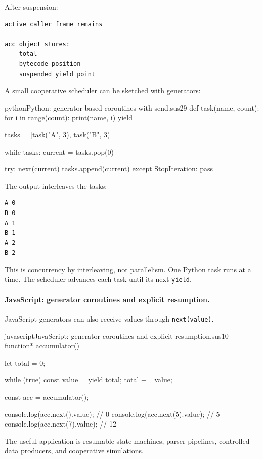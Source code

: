 After suspension:

\begin{verbatim}
active caller frame remains

acc object stores:
    total
    bytecode position
    suspended yield point
\end{verbatim}

A small cooperative scheduler can be sketched with generators:

\begin{codebox}[]{python}{Python: generator-based coroutines with send.}{sus29}
def task(name, count):
    for i in range(count):
        print(name, i)
        yield


tasks = [task("A", 3), task("B", 3)]

while tasks:
    current = tasks.pop(0)

    try:
        next(current)
        tasks.append(current)
    except StopIteration:
        pass
\end{codebox}


The output interleaves the tasks:

\begin{verbatim}
A 0
B 0
A 1
B 1
A 2
B 2
\end{verbatim}

This is concurrency by interleaving, not parallelism. One Python task runs at a time. The scheduler advances each task until its next \texttt{yield}.

\paragraph{JavaScript: generator coroutines and explicit resumption.}

JavaScript generators can also receive values through \texttt{next(value)}.

\begin{codebox}[]{javascript}{JavaScript: generator coroutines and explicit resumption.}{sus10}
function* accumulator() {
    let total = 0;

    while (true) {
        const value = yield total;
        total += value;
    }
}

const acc = accumulator();

console.log(acc.next().value);   // 0
console.log(acc.next(5).value);  // 5
console.log(acc.next(7).value);  // 12
\end{codebox}


The useful application is resumable state machines, parser pipelines, controlled data producers, and cooperative simulations.

